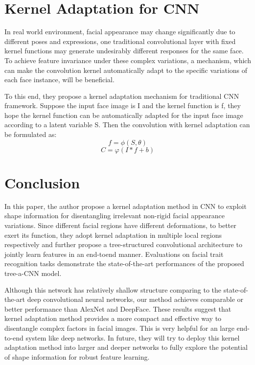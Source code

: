 \documentclass[10pt,twocolumn,letterpaper]{article}
\begin{document}
\section{Kernel Adaptation for CNN}
In real world environment, facial appearance may
change significantly due to different poses and expressions,
one traditional convolutional layer with fixed kernel functions
may generate undesirably different responses for the
same face. To achieve feature invariance under these complex
variations, a mechanism, which can make the convolution
kernel automatically adapt to the specific variations of
each face instance, will be beneficial.

To this end, they propose a kernel adaptation mechanism
for traditional CNN framework. Suppose the input face
image is I and the kernel function is f, they hope the kernel
function can be automatically adapted for the input face image
according to a latent variable S. Then the convolution
with kernel adaptation can be formulated as:
\begin{equation}
f=\phi(S,\theta)
\end{equation}
\begin{equation}
C=\varphi(I*f+b)
\end{equation}
\section{Conclusion}
In this paper, the author propose a kernel adaptation method in
CNN to exploit shape information for disentangling irrelevant
non-rigid facial appearance variations. Since different
facial regions have different deformations, to better exert its
function, they adopt kernel adaptation in multiple local regions
respectively and further propose a tree-structured convolutional
architecture to jointly learn features in an end-toend
manner. Evaluations on facial trait recognition tasks
demonstrate the state-of-the-art performances of the proposed
tree-a-CNN model.

Although this network has relatively shallow structure
comparing to the state-of-the-art deep convolutional neural
networks\cite{Krizhevsky2012ImageNet}, our method achieves comparable or
better performance than AlexNet\cite{Krizhevsky2012ImageNet} and DeepFace\cite{Taigman2014DeepFace}.
These results suggest that kernel adaptation method provides
a more compact and effective way to disentangle complex
factors in facial images. This is very helpful for an
large end-to-end system like deep networks. In future, they
will try to deploy this kernel adaptation method into larger
and deeper networks to fully explore the potential of shape
information for robust feature learning.
{\small


}
\end{document}
